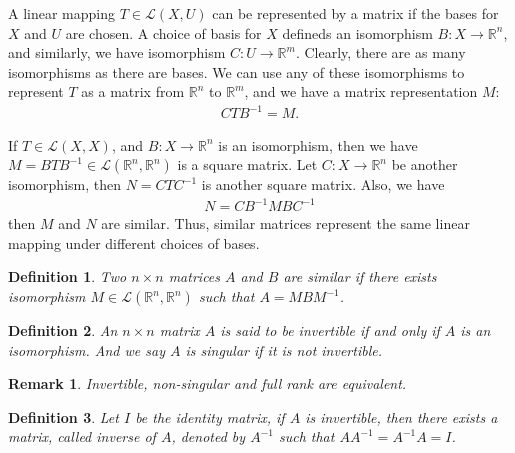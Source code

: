\documentclass[11pt]{book}
\newtheorem{definition}{Definition}[section]
\newtheorem{remark}{Remark}[section]
\theoremstyle{definition}
\numberwithin{equation}{chapter}
\begin{document}
\medskip

A linear mapping $T\in\mathscr{L}(X,U)$ can be represented by a matrix if the bases for $X$ and $U$ are chosen. A choice of basis for $X$ defineds an isomorphism $B:X\to\mathbb{R}^n$, and similarly, we have isomorphism $C: U\to\mathbb{R}^m$. Clearly, there are as many isomorphisms as there are bases. We can use any of these isomorphisms to represent $T$ as a matrix from $\mathbb{R}^n$ to $\mathbb{R}^m$, and we have a matrix representation $M$:
\begin{align*}
    CTB^{-1} = M.
\end{align*}

If $T\in\mathscr{L}(X,X)$, and $B:X\to\mathbb{R}^n$ is an isomorphism, then we have $M = BTB^{-1}\in\mathscr{L}(\mathbb{R}^n,\mathbb{R}^n)$ is a square matrix. Let $C:X\to\mathbb{R}^n$ be another isomorphism, then $N = CTC^{-1}$ is another square matrix. Also, we have 
\begin{align*}
    N = C B^{-1} M B C^{-1}
\end{align*}
then $M$ and $N$ are similar. Thus, similar matrices represent the same linear mapping under different choices of bases.

\medskip

\begin{definition}
Two $n\times n$ matrices $A$ and $B$ are similar if there exists isomorphism $M\in\mathscr{L}(\mathbb{R}^n,\mathbb{R}^n)$ such that $A = MBM^{-1}$.
\end{definition}

\medskip

\begin{definition}
An $n\times n$ matrix $A$ is said to be invertible if and only if $A$ is an isomorphism. And we say $A$ is singular if it is not invertible.
\end{definition}
\begin{remark}
Invertible, non-singular and full rank are equivalent.
\end{remark}

\medskip

\begin{definition}
Let $I$ be the identity matrix, if $A$ is invertible, then there exists a matrix, called inverse of $A$, denoted by $A^{-1}$ such that $AA^{-1} = A^{-1}A = I$.
\end{definition}

\medskip



\medskip
\end{document}
